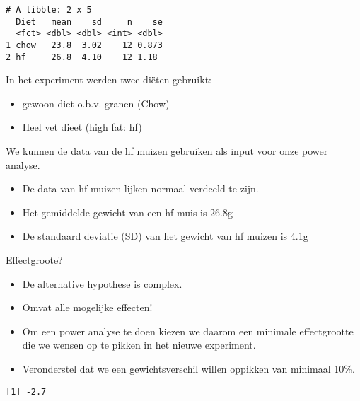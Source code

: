 \documentclass[
]{article}
\newenvironment{Shaded}{\begin{snugshade}}{\end{snugshade}}
\newcommand{\DecValTok}[1]{\textcolor[rgb]{0.00,0.00,0.81}{#1}}
\newcommand{\FunctionTok}[1]{\textcolor[rgb]{0.00,0.00,0.00}{#1}}
\newcommand{\NormalTok}[1]{#1}
\newcommand{\OtherTok}[1]{\textcolor[rgb]{0.56,0.35,0.01}{#1}}
\newcommand{\SpecialCharTok}[1]{\textcolor[rgb]{0.00,0.00,0.00}{#1}}
\providecommand{\tightlist}{%
  \setlength{\itemsep}{0pt}\setlength{\parskip}{0pt}}
\begin{document}
\begin{verbatim}
# A tibble: 2 x 5
  Diet   mean    sd     n    se
  <fct> <dbl> <dbl> <int> <dbl>
1 chow   23.8  3.02    12 0.873
2 hf     26.8  4.10    12 1.18 
\end{verbatim}

In het experiment werden twee diëten gebruikt:

\begin{itemize}
\tightlist
\item
  gewoon diet o.b.v. granen (Chow)
\item
  Heel vet dieet (high fat: hf)
\end{itemize}

We kunnen de data van de hf muizen gebruiken als input voor onze power
analyse.

\begin{itemize}
\tightlist
\item
  De data van hf muizen lijken normaal verdeeld te zijn.\\
\item
  Het gemiddelde gewicht van een hf muis is 26.8g
\item
  De standaard deviatie (SD) van het gewicht van hf muizen is 4.1g
\end{itemize}

Effectgroote?

\begin{itemize}
\tightlist
\item
  De alternative hypothese is complex.
\item
  Omvat alle mogelijke effecten!
\item
  Om een power analyse te doen kiezen we daarom een minimale
  effectgrootte die we wensen op te pikken in het nieuwe experiment.
\item
  Veronderstel dat we een gewichtsverschil willen oppikken van minimaal
  10\%.
\end{itemize}

\begin{Shaded}
\end{Shaded}

\begin{verbatim}
[1] -2.7
\end{verbatim}
\end{document}
